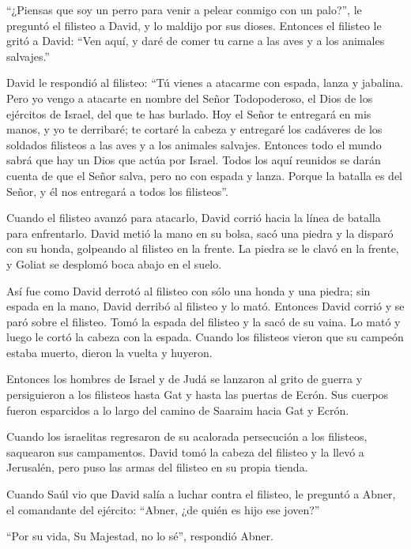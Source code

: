  ``¿Piensas que soy un perro para venir a pelear conmigo
con un palo?'', le preguntó el filisteo a David, y lo maldijo por sus
dioses.  Entonces el filisteo le gritó a David: ``Ven aquí,
y daré de comer tu carne a las aves y a los animales salvajes.''

 David le respondió al filisteo: ``Tú vienes a atacarme con
espada, lanza y jabalina. Pero yo vengo a atacarte en nombre del Señor
Todopoderoso, el Dios de los ejércitos de Israel, del que te has
burlado.  Hoy el Señor te entregará en mis manos, y yo te
derribaré; te cortaré la cabeza y entregaré los cadáveres de los
soldados filisteos a las aves y a los animales salvajes. Entonces todo
el mundo sabrá que hay un Dios que actúa por Israel.  Todos
los aquí reunidos se darán cuenta de que el Señor salva, pero no con
espada y lanza. Porque la batalla es del Señor, y él nos entregará a
todos los filisteos''.

 Cuando el filisteo avanzó para atacarlo, David corrió
hacia la línea de batalla para enfrentarlo.  David metió la
mano en su bolsa, sacó una piedra y la disparó con su honda, golpeando
al filisteo en la frente. La piedra se le clavó en la frente, y Goliat
se desplomó boca abajo en el suelo.

 Así fue como David derrotó al filisteo con sólo una honda
y una piedra; sin espada en la mano, David derribó al filisteo y lo
mató.  Entonces David corrió y se paró sobre el filisteo.
Tomó la espada del filisteo y la sacó de su vaina. Lo mató y luego le
cortó la cabeza con la espada. Cuando los filisteos vieron que su
campeón estaba muerto, dieron la vuelta y huyeron.

 Entonces los hombres de Israel y de Judá se lanzaron al
grito de guerra y persiguieron a los filisteos hasta Gat y hasta las
puertas de Ecrón. Sus cuerpos fueron esparcidos a lo largo del camino de
Saaraim hacia Gat y Ecrón.

 Cuando los israelitas regresaron de su acalorada
persecución a los filisteos, saquearon sus campamentos. 
David tomó la cabeza del filisteo y la llevó a Jerusalén, pero puso las
armas del filisteo en su propia tienda.

 Cuando Saúl vio que David salía a luchar contra el
filisteo, le preguntó a Abner, el comandante del ejército: ``Abner, ¿de
quién es hijo ese joven?''

``Por su vida, Su Majestad, no lo sé'', respondió Abner.

